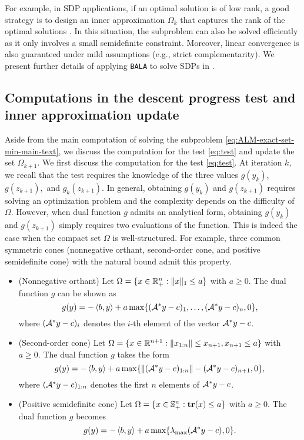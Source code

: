 \documentclass[11pt]{article}
\newcommand{\alg}{\texttt{BALA}}%
\begin{document}
For example, in SDP applications, if an optimal solution is of low rank, a good strategy is to design an inner approximation $\Omega_k$ that captures the rank of the optimal solutions \cite{ding2023revisiting,liao2023overview}. In this situation, the subproblem can also be solved efficiently as it only involves a small semidefinite constraint. Moreover, linear convergence is also guaranteed under mild assumptions (e.g., strict complementarity). 
We present further details of applying \alg{} to solve SDPs in .

\subsection{Computations in the descent progress test and inner approximation update}
\label{apx:subsection:compuation}
Aside from the main computation of solving the subproblem \cref{eq:ALM-exact-set-min-main-text}, we discuss the computation for the test \eqref{eq:test} and update the set $\Omega_{k+1}$. We first discuss the computation for the test \eqref{eq:test}. At iteration $k$, we recall that the test requires the knowledge of the three values $g(y_k)$, $g(z_{k+1}),$ and $g_k(z_{k+1})$. In general, obtaining $g(y_k)$ and $g(z_{k+1})$ requires solving an optimization problem and the complexity depends on the difficulty of $\Omega$. However, when dual function $g$ admits an analytical form, obtaining $g(y_k)$ and $g(z_{k+1})$ simply requires two evaluations of the function. This is indeed the case when the compact set $\Omega$ is well-structured. For example, three common symmetric cones (nonnegative orthant, second-order cone, and positive semidefinite cone) with the natural bound admit this property.
\begin{itemize}[leftmargin=*]
    \item (Nonnegative orthant) Let $\Omega =\{x \in \mathbb{R}^n_+ : \|x\|_1 \leq a\}$ with $a \geq 0$. The dual function $g$ can be shown as \begin{equation*}
    g(y) = -\left \langle b, y \right\rangle + a \max\{(\mathcal{A}^* y -c)_1,\ldots,(\mathcal{A}^* y -c)_n ,0 \},
\end{equation*}
where $(\mathcal{A}^* y -c)_i$ denotes the $i$-th element of the vector $\mathcal{A}^* y -c$.
    \item (Second-order cone) Let  $\Omega = \{x \in \mathbb{R}^{n+1} : \|x_{1:n}\|\leq x_{n+1}, x_{n+1} \leq a \}$ with $a \geq 0$. The dual function $g$ takes the form 
    \begin{equation*}
    g(y) = -\left \langle b, y \right\rangle + a \max\{ \| (\mathcal{A}^* y -c)_{1:n} \| - (\mathcal{A}^* y -c)_{n+1},0\},
\end{equation*}
where $(\mathcal{A}^* y -c)_{1:n}$ denotes the first $n$ elements of $\mathcal{A}^* y -c$. 
    \item (Positive semidefinite cone) Let $ \Omega=  \{x\in \mathbb{S}^n_+ : \mathop{\bf tr}(x) \leq a \}$ with $a \geq 0$. The dual function $g$ becomes 
    \begin{equation*}
        g(y) = -\left \langle b, y \right\rangle + a \max\{\lambda_{\max}(\mathcal{A}^* y - c),0\}.
    \end{equation*}
\end{itemize}
\end{document}
